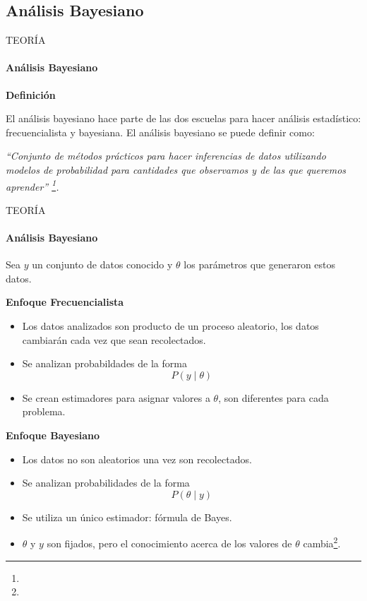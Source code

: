 \subsection{Análisis Bayesiano}
\begin{frame}{TEORÍA}
    \framesubtitle{Análisis Bayesiano}
    \textbf{Definición}

    El análisis bayesiano hace parte de las dos escuelas para hacer análisis estadístico: frecuencialista y bayesiana. El análisis bayesiano se puede definir como:
    \begin{center}
        \textit{``Conjunto de métodos prácticos para hacer inferencias de datos utilizando modelos de probabilidad para cantidades que observamos y de las que queremos aprender'' \footnote{}.}
    \end{center}
\end{frame}

\begin{frame}{TEORÍA}
    \framesubtitle{Análisis Bayesiano}
    Sea $y$ un conjunto de datos conocido y $\theta$ los parámetros que generaron estos datos.

    \begin{multicols}{2}
        \textbf{Enfoque Frecuencialista}

        \begin{itemize}
            \item Los datos analizados son producto de un proceso aleatorio, los datos cambiarán cada vez que sean recolectados.
            \item Se analizan probabildades de la forma
            \begin{equation*}
                P(y\mid\theta)
            \end{equation*}
            \item Se crean estimadores para asignar valores a $\theta$, son diferentes para cada problema.
        \end{itemize}\columnbreak
        \textbf{Enfoque Bayesiano}

        \begin{itemize}
            \item Los datos no son aleatorios una vez son recolectados.
            \item Se analizan probabilidades de la forma
            \begin{equation*}
                P(\theta\mid y)
            \end{equation*}
            \item Se utiliza un único estimador: fórmula de Bayes.
            \item $\theta$ y $y$ son fijados, pero el conocimiento acerca de los valores de $\theta$ cambia\footnote{}.
        \end{itemize}
    \end{multicols}
\end{frame}

